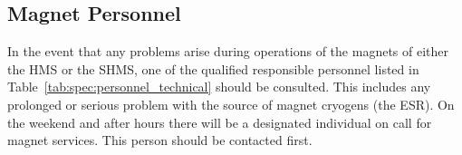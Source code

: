 {\subsection {Magnet Personnel}
In the event that any problems arise during operations of the magnets
of either the HMS or the SHMS,
one of the qualified responsible personnel listed in
Table~\ref{tab:spec:personnel_technical} should be consulted.  This includes any prolonged
or serious problem with the source of magnet cryogens (the ESR).
On the weekend and after hours there
will be a designated individual on call for magnet services. This person should be
contacted first.


%
%
%
}
